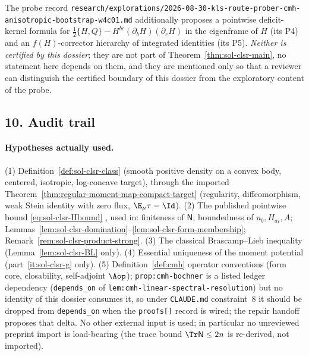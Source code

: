 \documentclass[../main.tex]{subfiles}
\begin{document}
\begin{remark}
\label{rem:sol-clsr-noncertified}
The probe record
\texttt{research/explorations/2026-08-30-kls-route-prober-cmh-anisotropic-bootstrap-w4c01.md}
additionally proposes a pointwise deficit-kernel formula for
$\tfrac12\{H,Q\}-H^{bc}(\partial_bH)(\partial_cH)$ in the eigenframe of $H$ (its P4) and an
$f(H)$-corrector hierarchy of integrated identities (its P5).  \emph{Neither is certified by
this dossier}; they are not part of Theorem~\ref{thm:sol-clsr-main}, no statement here depends
on them, and they are mentioned only so that a reviewer can distinguish the certified boundary
of this dossier from the exploratory content of the probe.
\end{remark}

\subsection*{10. Audit trail}

\paragraph{Hypotheses actually used.}
(1) Definition~\ref{def:sol-clsr-class} (smooth positive density on a convex body, centered,
isotropic, log-concave target), through the imported
Theorem~\ref{thm:regular-moment-map-compact-target} (regularity, diffeomorphism, weak Stein
identity with zero flux, $\E_\mu\tau=\Id$).
(2) The published pointwise bound \eqref{eq:sol-clsr-Hbound}
\cite{Klartag2013MomentMeasures}, used in: finiteness of $\mathsf N$; boundedness of
$u_b,H_{ai},A$; Lemmas~\ref{lem:sol-clsr-domination}--\ref{lem:sol-clsr-form-membership};
Remark~\ref{rem:sol-clsr-product-strong}.
(3) The classical Brascamp--Lieb inequality \cite{BrascampLieb1976}
(Lemma~\ref{lem:sol-clsr-BL} only).
(4) Essential uniqueness of the moment potential
\cite{CorderoErausquinKlartag2015MomentMeasures} (part~\ref{it:sol-clsr-g} only).
(5) Definition~\ref{def:cmh} operator conventions (form core, closability, self-adjoint
$\Aop$); \texttt{prop:cmh-bochner} is a listed ledger dependency (\texttt{depends\_on} of
\texttt{lem:cmh-linear-spectral-resolution}) but no identity of this dossier consumes it,
so under \texttt{CLAUDE.md} constraint~8 it should be dropped from \texttt{depends\_on} when
the \texttt{proofs[]} record is wired; the repair handoff proposes that delta.
No other external input is used; in particular no unreviewed preprint import is load-bearing
(the trace bound $\Tr\mathsf N\le2n$ is re-derived, not imported).
\end{document}
